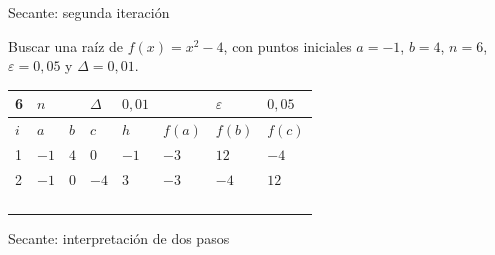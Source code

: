 \documentclass[main.tex]{subfiles}
\begin{document}
\begin{frame}[t]{Secante: segunda iteración}
\begin{minipage}[t][13mm][t]{\textwidth}\small Buscar una raíz de $f(x)=x^2-4$, con puntos iniciales $a=-1$, $b=4$, $n=6$, $\varepsilon=0{,}05$ y $\Delta=0{,}01$.\end{minipage}\par{\scriptsize\setlength{\tabcolsep}{2pt}\renewcommand{\arraystretch}{1}\begin{center}\begin{tabular}{|C{.04\textwidth}|C{.112\textwidth}|C{.112\textwidth}|C{.112\textwidth}|C{.112\textwidth}|C{.112\textwidth}|C{.112\textwidth}|C{.112\textwidth}|}
\hline
\rule{0pt}{4.3mm}6 & $n$ &  &  $\Delta$  & $0{,}01$ &  & $\varepsilon$ & $0{,}05$\\\hline
\rule{0pt}{4.3mm}$i$ & $a$ & $b$ & $c$ & $h$ & $f(a)$ & $f(b)$ & $f(c)$\\\hline
\rule{0pt}{4.3mm}1 & $-1$ & $4$ & $0$ & $-1$ & $-3$ & $12$ & $-4$\\\hline
\rule{0pt}{4.3mm}2 & $-1$ & $0$ & $-4$ & $3$ & $-3$ & $-4$ & $12$\\\hline
\rule{0pt}{4.3mm} &  &  &  &  &  &  & \\\hline
\rule{0pt}{4.3mm} &  &  &  &  &  &  & \\\hline
\rule{0pt}{4.3mm} &  &  &  &  &  &  & \\\hline
\rule{0pt}{4.3mm} &  &  &  &  &  &  & \\\hline
\end{tabular}\end{center}}\begin{minipage}[t][10mm][t]{\textwidth}\footnotesize \end{minipage}
\end{frame}

\begin{frame}{Secante: interpretación de dos pasos}
\end{frame}
\end{document}
